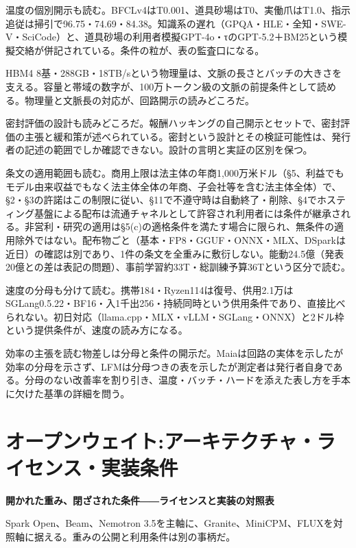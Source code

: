 \documentclass[lualatex,a4paper,10pt]{jlreq}
\begin{document}
温度の個別開示も読む。BFCLv4はT0.001、道具砂場はT0、実働爪はT1.0、指示追従は掃引で96.75・74.69・84.38。知識系の遅れ（GPQA・HLE・全知・SWE-V・SciCode）と、道具砂場の利用者模擬GPT-4o・τのGPT-5.2＋BM25という模擬交絡が併記されている。条件の粒が、表の監査口になる。
\cite{B11,B69,B12}


HBM4 8基・288GB・18TB/sという物理量は、文脈の長さとバッチの大きさを支える。容量と帯域の数字が、100万トークン級の文脈の前提条件として読める。物理量と文脈長の対応が、回路開示の読みどころだ。
\cite{B09,B66,B10,B67,B68}


密封評価の設計も読みどころだ。報酬ハッキングの自己開示とセットで、密封評価の主張と緩和策が述べられている。密封という設計とその検証可能性は、発行者の記述の範囲でしか確認できない。設計の言明と実証の区別を保つ。
\cite{B11,B69,B12}


条文の適用範囲も読む。商用上限は法主体の年商1,000万米ドル（§5、利益でもモデル由来収益でもなく法主体全体の年商、子会社等を含む法主体全体）で、§2・§3の許諾はこの制限に従い、§11で不遵守時は自動終了・削除、§4でホスティング基盤による配布は流通チャネルとして許容され利用者には条件が継承される。非営利・研究の適用は§5(c)の適格条件を満たす場合に限られ、無条件の適用除外ではない。配布物ごと（基本・FP8・GGUF・ONNX・MLX、DSparkは近日）の確認は別であり、1件の条文を全重みに敷衍しない。能動24.5億（発表20億との差は表記の問題）、事前学習約33T・総訓練予算36Tという区分で読む。
\cite{B11,B69,B12,B90}


速度の分母も分けて読む。携帯184・Ryzen114は復号、供用2.1万はSGLang0.5.22・BF16・入1千出256・持続同時という供用条件であり、直接比べられない。初日対応（llama.cpp・MLX・vLLM・SGLang・ONNX）と2ドル枠という提供条件が、速度の読み方になる。
\cite{B11,B69,B12}


効率の主張を読む物差しは分母と条件の開示だ。Maiaは回路の実体を示したが効率の分母を示さず、LFMは分母つきの表を示したが測定者は発行者自身である。分母のない改善率を割り引き、温度・バッチ・ハードを添えた表し方を手本に欠けた基準の詳細を問う。
\cite{B09,B66,B10,B67,B68,B11,B69,B12}


\section{オープンウェイト:アーキテクチャ・ライセンス・実装条件}
\label{sec:P3}

{\Large\bfseries 開かれた重み、閉ざされた条件――ライセンスと実装の対照表\par}
\smallskip
{\color{SurveyMuted}Spark Open、Beam、Nemotron 3.5を主軸に、Granite、MiniCPM、FLUXを対照軸に据える。重みの公開と利用条件は別の事柄だ。\par}
\bigskip
\end{document}

